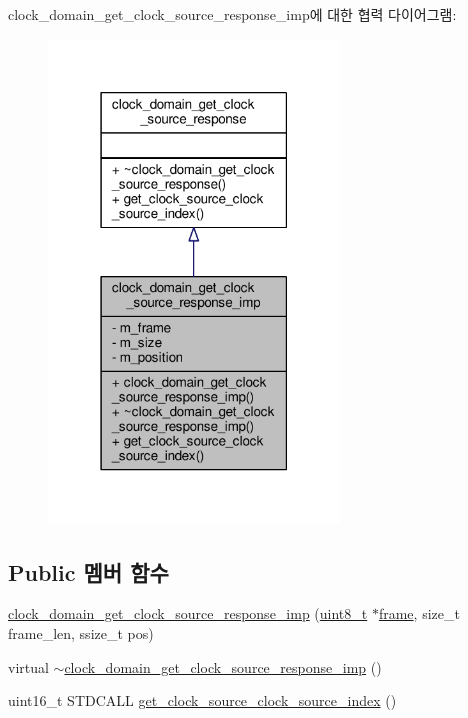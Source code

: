 clock\+\_\+domain\+\_\+get\+\_\+clock\+\_\+source\+\_\+response\+\_\+imp에 대한 협력 다이어그램\+:
\nopagebreak
\begin{figure}[H]
\begin{center}
\leavevmode
\includegraphics[width=219pt]{classavdecc__lib_1_1clock__domain__get__clock__source__response__imp__coll__graph}
\end{center}
\end{figure}
\subsection*{Public 멤버 함수}
\begin{DoxyCompactItemize}
\item 
\hyperlink{classavdecc__lib_1_1clock__domain__get__clock__source__response__imp_a0b29292e3343c2f5d0cafaf82f01b221}{clock\+\_\+domain\+\_\+get\+\_\+clock\+\_\+source\+\_\+response\+\_\+imp} (\hyperlink{stdint_8h_aba7bc1797add20fe3efdf37ced1182c5}{uint8\+\_\+t} $\ast$\hyperlink{gst__avb__playbin_8c_ac8e710e0b5e994c0545d75d69868c6f0}{frame}, size\+\_\+t frame\+\_\+len, ssize\+\_\+t pos)
\item 
virtual \hyperlink{classavdecc__lib_1_1clock__domain__get__clock__source__response__imp_ac84f999a496b26276b4fae04aad34e53}{$\sim$clock\+\_\+domain\+\_\+get\+\_\+clock\+\_\+source\+\_\+response\+\_\+imp} ()
\item 
uint16\+\_\+t S\+T\+D\+C\+A\+LL \hyperlink{classavdecc__lib_1_1clock__domain__get__clock__source__response__imp_a8eaead4935f2a008c4d3b3367b88f713}{get\+\_\+clock\+\_\+source\+\_\+clock\+\_\+source\+\_\+index} ()
\end{DoxyCompactItemize}
